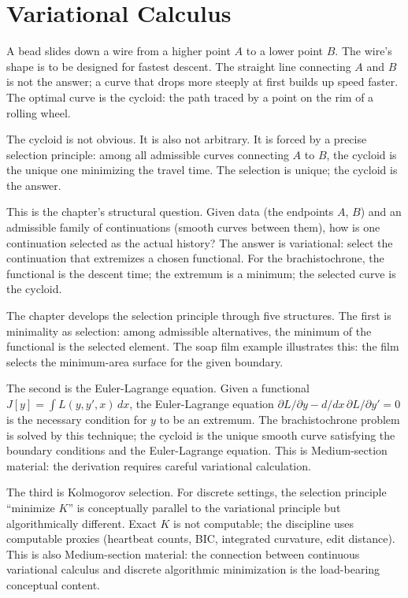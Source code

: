 \chapter{Variational Calculus}
\label{chap:variational-calculus}


\begin{chapteressay}

A bead slides down a wire from a higher point $A$ to a lower point
$B$. The wire's shape is to be designed for fastest descent. The
straight line connecting $A$ and $B$ is not the answer; a curve that
drops more steeply at first builds up speed faster. The optimal
curve is the cycloid: the path traced by a point on the rim of a
rolling wheel.

The cycloid is not obvious. It is also not arbitrary. It is forced
by a precise selection principle: among all admissible curves
connecting $A$ to $B$, the cycloid is the unique one minimizing the
travel time. The selection is unique; the cycloid is the answer.

This is the chapter's structural question. Given data (the endpoints
$A$, $B$) and an admissible family of continuations (smooth curves
between them), how is one continuation selected as the actual
history? The answer is variational: select the continuation that
extremizes a chosen functional. For the brachistochrone, the
functional is the descent time; the extremum is a minimum; the
selected curve is the cycloid.

The chapter develops the selection principle through five
structures. The first is minimality as selection: among
admissible alternatives, the minimum of the functional is the
selected element. The soap film example illustrates this: the
film selects the minimum-area surface for the given boundary.

The second is the Euler-Lagrange equation. Given a functional
$J[y] = \int L(y, y', x) \, dx$, the Euler-Lagrange equation
$\partial L/\partial y - d/dx \, \partial L/\partial y' = 0$ is
the necessary condition for $y$ to be an extremum. The
brachistochrone problem is solved by this technique; the cycloid
is the unique smooth curve satisfying the boundary conditions
and the Euler-Lagrange equation. This is Medium-section
material: the derivation requires careful variational
calculation.

The third is Kolmogorov selection. For discrete settings, the
selection principle ``minimize $K$'' is conceptually parallel
to the variational principle but algorithmically different.
Exact $K$ is not computable; the discipline uses computable
proxies (heartbeat counts, BIC, integrated curvature, edit
distance). This is also Medium-section material: the connection
between continuous variational calculus and discrete
algorithmic minimization is the load-bearing conceptual
content.


\end{chapteressay}
